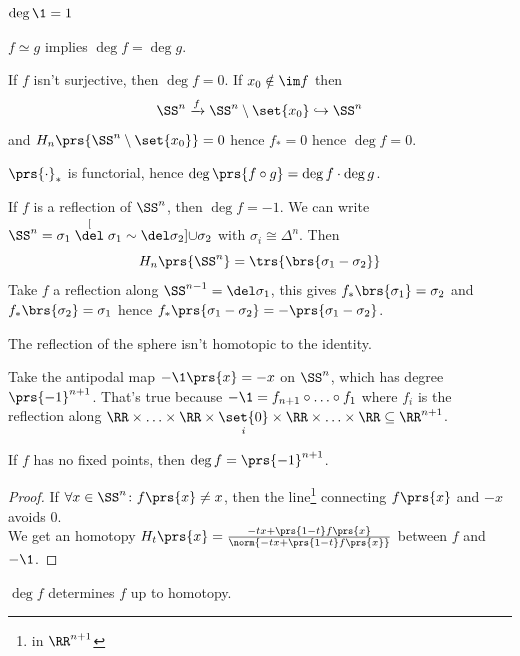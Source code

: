 \documentclass[10pt,a4paper,twoside,openany,hidelinks]{book}
\begin{document}
\begin{remark}
\item $\deg \1 = 1$
\item $f \simeq g$ implies $\deg f = \deg g$.
\item If $f$ isn't surjective, then $\deg f = 0$. If $x_0 \notin \im f$ then
\[\SS^n \xrightarrow{f} \SS^n \setminus \set{x_0} \hookrightarrow \SS^n\]
and $H_n\prs{\SS^n \setminus \set{x_0}} = 0$ hence
$f_* = 0$ hence $\deg f = 0$.
\item $\prs{\cdot}_*$ is functorial, hence $\deg\prs{f\circ g} = \deg f \cdot \deg g$.
\item If $f$ is a reflection of $\SS^n$, then $\deg f = - 1$.
We can write $\SS^n = \sigma_1 \stackrel[\del \sigma_1 \sim \del \sigma_2]{}{\cup} \sigma_2$ with $\sigma_i \cong \Delta^n$. Then
\[H_n\prs{\SS^n} = \trs{\brs{\sigma_1 - \sigma_2}}\]
Take $f$ a reflection along $\SS^{n-1} = \del \sigma_1$, this gives $f_*\brs{\sigma_1} = \sigma_2$ and $f_*\brs{\sigma_2} = \sigma_1$ hence $f_*\prs{\sigma_1 - \sigma_2} = -\prs{\sigma_1 - \sigma_2}$.
\begin{corollary}
The reflection of the sphere isn't homotopic to the identity.
\end{corollary}
\item Take the antipodal map $-\1\prs{x} = - x$ on $\SS^n$, which has degree $\prs{-1}^{n+1}$.
That's true because $-\1 = f_{n+1} \circ \ldots \circ f_1$ where $f_i$ is the reflection along $\RR \times \ldots \times \RR \times \underset{i}{\set{0}} \times \RR \times \ldots \times \RR \subseteq \RR^{n+1}$.
\begin{corollary}
If $f$ has no fixed points, then $\deg f = \prs{-1}^{n+1}$.
\end{corollary}
\begin{proof}
If $\forall x \in \SS^n \colon f\prs{x} \neq x$, then the line\footnote{in $\RR^{n+1}$} connecting $f\prs{x}$ and $-x$ avoids $0$.\\
We get an homotopy $H_t\prs{x} = \frac{-tx + \prs{1-t}f\prs{x}}{\norm{-tx + \prs{1-t}f\prs{x}}}$ between $f$ and $-\1$.
\end{proof}
\end{remark}

\begin{theorem}[Hopf]
$\deg f$ determines $f$ up to homotopy.
\end{theorem}
\end{document}
